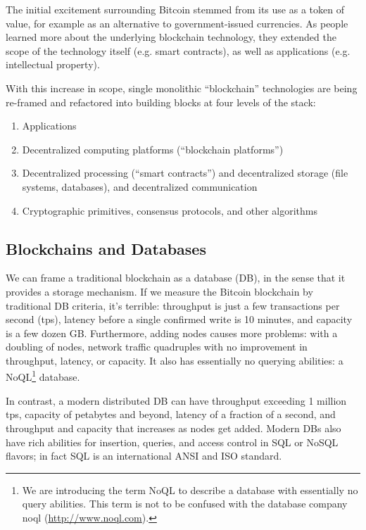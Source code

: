 The initial excitement surrounding Bitcoin stemmed from its use as a token of value, for example as an alternative to government-issued currencies.
As people learned more about the underlying blockchain technology, they extended the scope of the technology itself (e.g. smart contracts), as well as applications (e.g. intellectual property).

With this increase in scope, single monolithic ``blockchain'' technologies are being re-framed and refactored into building blocks at four levels of the stack:
\begin{enumerate}
 \item Applications
 \item Decentralized computing platforms (``blockchain platforms'')
 \item Decentralized processing (``smart contracts'') and decentralized storage (file systems, databases), and decentralized communication
 \item Cryptographic primitives, consensus protocols, and other algorithms
\end{enumerate}

\subsection{Blockchains and Databases}
We can frame a traditional blockchain as a database (DB), in the sense that it provides a storage mechanism.
If we measure the Bitcoin blockchain by traditional DB criteria, it’s terrible: throughput is just a few transactions per second (tps), latency before a single confirmed write is 10 minutes, and capacity is a few dozen GB.
Furthermore, adding nodes causes more problems: with a doubling of nodes, network traffic quadruples with no improvement in throughput, latency, or capacity.
It also has essentially no querying abilities: a NoQL\footnote{We are introducing the term NoQL to describe a database with essentially no query abilities. This term is not to be confused with the database company noql (\url{http://www.noql.com}).} database.

In contrast, a modern distributed DB can have throughput exceeding 1 million tps, capacity of petabytes and beyond, latency of a fraction of a second, and throughput and capacity that increases as nodes get added.
Modern DBs also have rich abilities for insertion, queries, and access control in SQL or NoSQL flavors; in fact SQL is an international ANSI and ISO standard.


